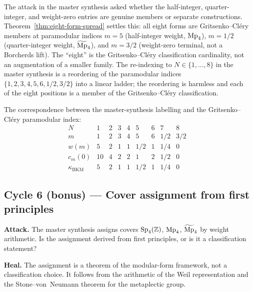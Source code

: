 \begin{remark}[$N = 5$, $N = 7$, $N = 8$ are members, not separate constructions]
\label{rem:grit-clery-members}
The attack in the master synthesis asked whether the half-integer,
quarter-integer, and weight-zero entries are genuine members or
separate constructions. Theorem~\ref{thm:eight-form-spread} settles
this: all eight forms are Gritsenko--Cl\'ery members at paramodular
indices $m = 5$ (half-integer weight, $\mathrm{Mp}_4$), $m = 1/2$
(quarter-integer weight, $\widetilde{\mathrm{Mp}}_4$), and $m = 3/2$ (weight-zero
terminal, not a Borcherds lift). The ``eight'' is the Gritsenko--Cl\'ery
classification cardinality, not an augmentation of a smaller family.
The re-indexing to $N \in \{1, \ldots, 8\}$ in the master synthesis is
a reordering of the paramodular indices
$\{1, 2, 3, 4, 5, 6, 1/2, 3/2\}$ into a linear ladder; the reordering
is harmless and each of the eight positions is a member of the
Gritsenko--Cl\'ery classification.

The correspondence between the master-synthesis labelling and the
Gritsenko--Cl\'ery paramodular index:
\[
  \begin{array}{c|cccccccc}
  N & 1 & 2 & 3 & 4 & 5 & 6 & 7 & 8 \\
  m & 1 & 2 & 3 & 4 & 5 & 6 & 1/2 & 3/2 \\
  w(m) & 5 & 2 & 1 & 1 & 1/2 & 1 & 1/4 & 0 \\
  c_m(0) & 10 & 4 & 2 & 2 & 1 & 2 & 1/2 & 0 \\
  \kappa_{\mathrm{BKM}} & 5 & 2 & 1 & 1 & 1/2 & 1 & 1/4 & 0
  \end{array}
\]
\end{remark}

\subsection*{Cycle 6 (bonus) --- Cover assignment from first principles}

\textbf{Attack.} The master synthesis assigns covers $\mathrm{Sp}_4(\mathbb{Z})$,
$\mathrm{Mp}_4$, $\widetilde{\mathrm{Mp}}_4$ by weight arithmetic. Is the assignment derived
from first principles, or is it a classification statement?

\textbf{Heal.} The assignment is a theorem of the modular-form
framework, not a classification choice. It follows from the
arithmetic of the Weil representation and the Stone--von~Neumann
theorem for the metaplectic group.

